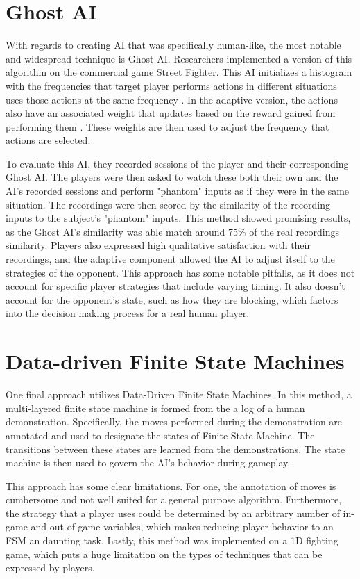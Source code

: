 \section{Ghost AI}
With regards to creating AI that was specifically human-like, the most notable and widespread technique is Ghost AI. Researchers implemented a version of this algorithm on the commercial game Street Fighter. This AI initializes a histogram with the frequencies that target player performs actions in different situations uses those actions at the same frequency \parencite{Ghost AI}. In the adaptive version, the actions also have an associated weight that updates based on the reward gained from performing them \parencite{Ghost AI2}. These weights are then used to adjust the frequency that actions are selected.

To evaluate this AI, they recorded sessions of the player and their corresponding Ghost AI. The players were then asked to watch these both their own and the AI's recorded sessions and perform "phantom" inputs as if they were in the same situation. The recordings were then scored by the similarity of the recording inputs to the subject's "phantom" inputs. This method showed promising results, as the Ghost AI's similarity was able match around 75\% of the real recordings similarity. Players also expressed high qualitative satisfaction with their recordings, and the adaptive component allowed the AI to adjust itself to the strategies of the opponent. This approach has some notable pitfalls, as it does not account for specific player strategies that include varying timing. It also doesn't account for the opponent's state, such as how they are blocking, which factors into the decision making process for a real human player. 

\section{Data-driven Finite State Machines}
One final approach utilizes Data-Driven Finite State Machines. In this method, a multi-layered finite state machine is formed from the a log of a human demonstration. Specifically, the moves performed during the demonstration are annotated and used to designate the states of Finite State Machine. The transitions between these states are learned from the demonstrations. The state machine is then used to govern the AI's behavior during gameplay.

This approach has some clear limitations. For one, the annotation of moves is cumbersome and not well suited for a general purpose algorithm. Furthermore, the strategy that a player uses could be determined by an arbitrary number of in-game and out of game variables, which makes reducing player behavior to an FSM an daunting task. Lastly, this method was implemented on a 1D fighting game, which puts a huge limitation on the types of techniques that can be expressed by players.

